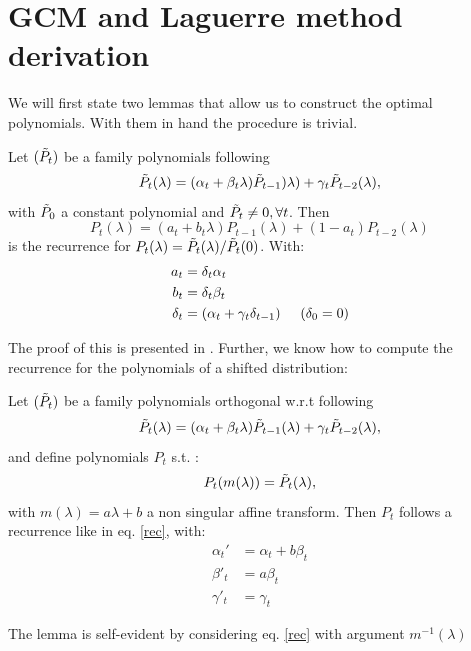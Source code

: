 \documentclass{article}
\begin{document}
\section{GCM and Laguerre method derivation}
We will first state two lemmas that allow us to construct the optimal polynomials. With them in hand the procedure is trivial.

\begin{lemma} \label{lemma: to residual}
Let $(\Tilde{P}_t)$ be a family polynomials  following  
\begin{equation*}
    \Tilde{P}_t(\lambda)=(\alpha_t+\beta_t\lambda)\Tilde{P}_{t-1})\lambda)+\gamma_t\Tilde{P}_{t-2}(\lambda),
\end{equation*}
with $\Tilde{P}_0$ a constant polynomial and $\Tilde{P}_t\neq0, \forall t$. Then
\begin{equation}
    P_t(\lambda)=(a_t+b_t\lambda)P_{t-1}(\lambda)+(1-a_t)P_{t-2}(\lambda)
\end{equation} is the recurrence for $P_t(\lambda)=\Tilde{P}_t(\lambda)/\Tilde{P}_t(0)$. With:
\begin{align}
    a_t&=\delta_t\alpha_t \\
    b_t&=\delta_t\beta_t \\
    \delta_t&=(\alpha_t+\gamma_t\delta_{t-1}) \hspace{0.5 cm } (\delta_0=0)
\end{align}
\end{lemma}
The proof of this is presented in \cite{pedregosa2020acceleration}. Further, we know how to compute the recurrence for the polynomials of a shifted distribution:
\begin{lemma}

Let $(\Tilde{P}_t)$ be a family polynomials orthogonal w.r.t  following  
\begin{equation}    \label{rec}
    \Tilde{P}_t(\lambda)=(\alpha_t+\beta_t\lambda)\Tilde{P}_{t-1}(\lambda)+\gamma_t\Tilde{P}_{t-2}(\lambda) ,
\end{equation}
and define polynomials $P_t$ s.t. :
$$
P_t(m(\lambda))=\Tilde{P}_t(\lambda),
$$
with $m(\lambda)=a\lambda+b$ a non singular affine transform. Then $P_t$ follows a recurrence like in eq. \eqref{rec}, with:
\begin{align}
    \alpha_t'&=\alpha_t+b\beta_t \\
    \beta'_t&=a\beta_t\\
    \gamma'_t&=\gamma_t
\end{align}
\end{lemma}
The lemma is self-evident by considering eq. \eqref{rec} with argument $m^{-1}(\lambda)$
\end{document}
